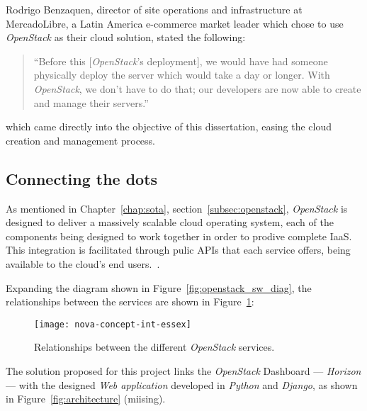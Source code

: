 Rodrigo Benzaquen, director of site operations and infrastructure at MercadoLibre, a Latin America e-commerce market leader which chose to use \textit{OpenStack} as their cloud solution, stated the following:

\begin{quote}
 ``Before this [\textit{OpenStack}'s deployment], we would have had someone physically deploy the server which would take a day or longer. With \textit{OpenStack}, we don't have to do that; our developers are now able to create and manage their servers.''\cite{openstack-userstories}
\end{quote}

which came directly into the objective of this dissertation, easing the cloud creation and management process.

\clearpage
\subsection{Connecting the dots}\label{subsec:architecture}

As mentioned in Chapter~\ref{chap:sota}, section~\ref{subsec:openstack}, \textit{OpenStack} is designed to deliver a massively scalable cloud operating system, each of the components being designed to work together in order to prodive complete IaaS. This integration is facilitated through pulic APIs that each service offers, being available to the cloud's end users.~\cite{ken-pepple:essex-arch}. 

Expanding the diagram shown in Figure~\ref{fig:openstack_sw_diag}, the relationships between the services are shown in Figure~\ref{fig:openstack_services}:

\begin{figure}[h!]
  \begin{center}
    \leavevmode
    \texttt{[image: nova-concept-int-essex]}
    \caption{Relationships between the different \textit{OpenStack} services\cite{ken-pepple:essex-arch}.}
    \label{fig:openstack_services}
  \end{center}
\end{figure}

The solution proposed for this project links the \textit{OpenStack} Dashboard --- \textit{Horizon} --- with the designed \textit{Web application} developed in \textit{Python} and \textit{Django}, as shown in Figure~\ref{fig:architecture} (miising).







